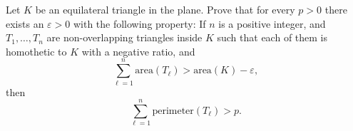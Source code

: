 \documentclass{article}
\begin{document}
\setlength{\parindent}{0pt}
Let $K$ be an equilateral triangle in the plane. Prove that for every $p>0$ there exists an $\varepsilon>0$ with the following property: If $n$ is a positive integer, and $T_1,\ldots,T_n$ are non-overlapping triangles inside $K$ such that each of them is homothetic to $K$ with a negative ratio, and$$
\sum_{\ell=1}^n \textrm{area}(T_\ell)>\textrm{area}(K)-\varepsilon,
$$then$$
\sum_{\ell=1}^n \textrm{perimeter}(T_\ell)>p.
$$
\end{document}
